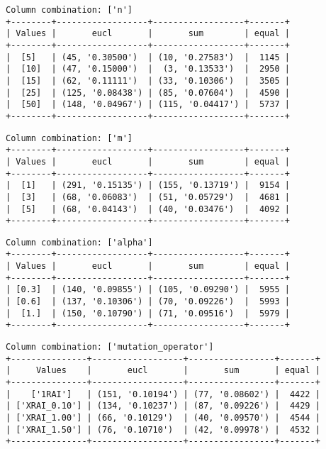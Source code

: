 \documentclass{article}
\begin{document}
\begin{verbatim}
Column combination: ['n']
+--------+------------------+------------------+-------+
| Values |       eucl       |       sum        | equal |
+--------+------------------+------------------+-------+
|  [5]   | (45, '0.30500')  | (10, '0.27583')  |  1145 |
|  [10]  | (47, '0.15000')  |  (3, '0.13533')  |  2950 |
|  [15]  | (62, '0.11111')  | (33, '0.10306')  |  3505 |
|  [25]  | (125, '0.08438') | (85, '0.07604')  |  4590 |
|  [50]  | (148, '0.04967') | (115, '0.04417') |  5737 |
+--------+------------------+------------------+-------+
\end{verbatim}

\begin{verbatim}
Column combination: ['m']
+--------+------------------+------------------+-------+
| Values |       eucl       |       sum        | equal |
+--------+------------------+------------------+-------+
|  [1]   | (291, '0.15135') | (155, '0.13719') |  9154 |
|  [3]   | (68, '0.06083')  | (51, '0.05729')  |  4681 |
|  [5]   | (68, '0.04143')  | (40, '0.03476')  |  4092 |
+--------+------------------+------------------+-------+
\end{verbatim}

\begin{verbatim}
Column combination: ['alpha']
+--------+------------------+------------------+-------+
| Values |       eucl       |       sum        | equal |
+--------+------------------+------------------+-------+
| [0.3]  | (140, '0.09855') | (105, '0.09290') |  5955 |
| [0.6]  | (137, '0.10306') | (70, '0.09226')  |  5993 |
|  [1.]  | (150, '0.10790') | (71, '0.09516')  |  5979 |
+--------+------------------+------------------+-------+
\end{verbatim}

\begin{verbatim}
Column combination: ['mutation_operator']
+---------------+------------------+-----------------+-------+
|     Values    |       eucl       |       sum       | equal |
+---------------+------------------+-----------------+-------+
|    ['1RAI']   | (151, '0.10194') | (77, '0.08602') |  4422 |
| ['XRAI_0.10'] | (134, '0.10237') | (87, '0.09226') |  4429 |
| ['XRAI_1.00'] | (66, '0.10129')  | (40, '0.09570') |  4544 |
| ['XRAI_1.50'] | (76, '0.10710')  | (42, '0.09978') |  4532 |
+---------------+------------------+-----------------+-------+
\end{verbatim}
\end{document}
